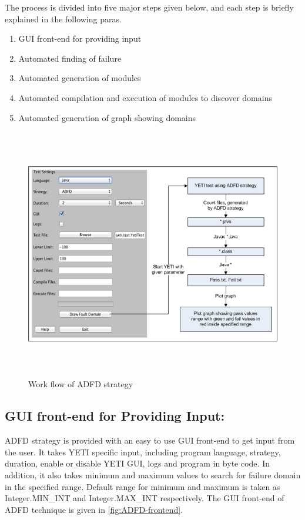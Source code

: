 The process is divided into five major steps given below, and each step is briefly explained in the following paras.

\begin{enumerate}
\item GUI front-end for providing input
\item Automated finding of failure
\item Automated generation of modules
\item Automated compilation and execution of modules to discover domains
\item Automated generation of graph showing domains
\end{enumerate}

\bigskip
\begin{figure}[ht]
\centering
\includegraphics[width=15cm,height=11cm]{chapter5/ADFD_Diagram1.png}
\bigskip
\caption{Work flow of ADFD strategy}
\label{fig:ADFD-workflow}
\end{figure}
\bigskip

\subsection{GUI front-end for Providing Input:}
ADFD strategy is provided with an easy to use GUI front-end to get input from the user. It takes YETI specific input, including program language, strategy, duration, enable or disable YETI GUI, logs and program in byte code. In addition, it also takes minimum and maximum values to search for failure domain in the specified range. Default range for minimum and maximum is taken as Integer.MIN\_INT and Integer.MAX\_INT respectively. The GUI front-end of ADFD technique is given in \ref{fig:ADFD-frontend}.


